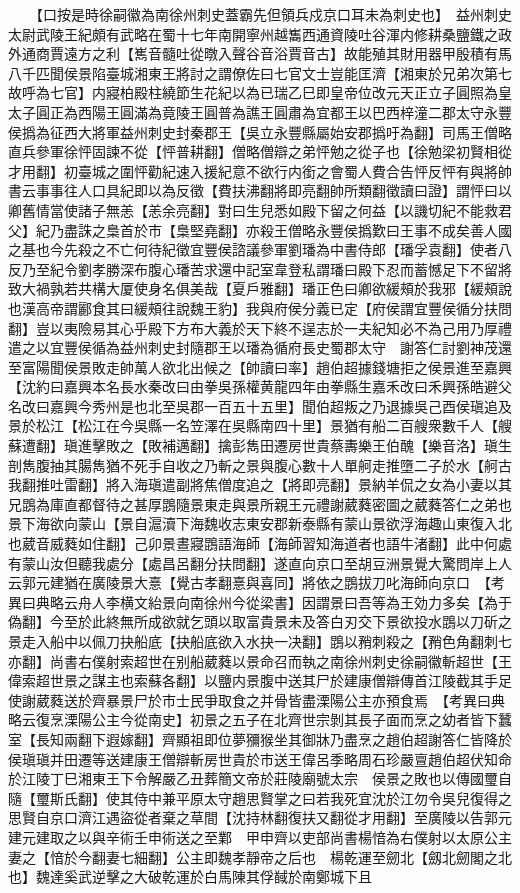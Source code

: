 　　【口按是時徐嗣徽為南徐州刺史蓋霸先但領兵戍京口耳未為刺史也】　益州刺史太尉武陵王紀頗有武略在蜀十七年南開寧州越雟西通資陵吐谷渾内修耕桑鹽鐵之政外通商賈遠方之利【嶲音髓吐從暾入聲谷音浴賈音古】故能殖其財用器甲殷積有馬八千匹聞侯景陷臺城湘東王將討之謂僚佐曰七官文士豈能匡濟【湘東於兄弟次第七故呼為七官】内寢柏殿柱繞節生花紀以為已瑞乙巳即皇帝位改元天正立子圓照為皇太子圓正為西陽王圓滿為竟陵王圓普為譙王圓肅為宜都王以巴西梓潼二郡太守永豐侯撝為征西大將軍益州刺史封秦郡王【吳立永豐縣屬始安郡撝吁為翻】司馬王僧略直兵參軍徐怦固諫不從【怦普耕翻】僧略僧辯之弟怦勉之從子也【徐勉梁初賢相從才用翻】初臺城之圍怦勸紀速入援紀意不欲行内銜之會蜀人費合告怦反怦有與將帥書云事事往人口具紀即以為反徵【費扶沸翻將即亮翻帥所類翻徵讀曰證】謂怦曰以卿舊情當使諸子無恙【恙余亮翻】對曰生兒悉如殿下留之何益【以譏切紀不能救君父】紀乃盡誅之梟首於市【梟堅堯翻】亦殺王僧略永豐侯撝歎曰王事不成矣善人國之基也今先殺之不亡何待紀徵宜豐侯諮議參軍劉璠為中書侍郎【璠孚袁翻】使者八反乃至紀令劉孝勝深布腹心璠苦求還中記室韋登私謂璠曰殿下忍而蓄憾足下不留將致大禍孰若共構大厦使身名俱美哉【夏戶雅翻】璠正色曰卿欲緩頰於我邪【緩頰說也漢高帝謂酈食其曰緩頰往說魏王豹】我與府侯分義已定【府侯謂宜豐侯循分扶問翻】豈以夷險易其心乎殿下方布大義於天下終不逞志於一夫紀知必不為己用乃厚禮遣之以宜豐侯循為益州刺史封隨郡王以璠為循府長史蜀郡太守　謝答仁討劉神茂還至富陽聞侯景敗走帥萬人欲北出候之【帥讀曰率】趙伯超據錢塘拒之侯景進至嘉興【沈約曰嘉興本名長水秦改曰由拳吳孫權黄龍四年由拳縣生嘉禾改曰禾興孫皓避父名改曰嘉興今秀州是也北至吳郡一百五十五里】聞伯超叛之乃退據吳己酉侯瑱追及景於松江【松江在今吳縣一名笠澤在吳縣南四十里】景猶有船二百艘衆數千人【艘蘇遭翻】瑱進擊敗之【敗補邁翻】擒彭雋田遷房世貴蔡夀樂王伯醜【樂音洛】瑱生剖雋腹抽其腸雋猶不死手自收之乃斬之景與腹心數十人單舸走推墮二子於水【舸古我翻推吐雷翻】將入海瑱遣副將焦僧度追之【將即亮翻】景納羊侃之女為小妻以其兄鵾為庫直都督待之甚厚鵾隨景東走與景所親王元禮謝葳蕤密圖之葳蕤答仁之弟也景下海欲向蒙山【景自滬瀆下海魏收志東安郡新泰縣有蒙山景欲浮海趣山東復入北也葳音威蕤如住翻】己卯景晝寢鵾語海師【海師習知海道者也語牛渚翻】此中何處有蒙山汝但聽我處分【處昌呂翻分扶問翻】遂直向京口至胡豆洲景覺大驚問岸上人云郭元建猶在廣陵景大憙【覺古孝翻憙與喜同】將依之鵾拔刀叱海師向京口　【考異曰典略云舟人李横文紿景向南徐州今從梁書】因謂景曰吾等為王効力多矣【為于偽翻】今至於此終無所成欲就乞頭以取富貴景未及答白刃交下景欲投水鵾以刀斫之景走入船中以佩刀抉船底【抉船底欲入水抉一决翻】鵾以矟刺殺之【矟色角翻刺七亦翻】尚書右僕射索超世在别船葳蕤以景命召而執之南徐州刺史徐嗣徽斬超世【王偉索超世景之謀主也索蘇各翻】以鹽内景腹中送其尸於建康僧辯傳首江陵截其手足使謝葳蕤送於齊暴景尸於市士民爭取食之并骨皆盡溧陽公主亦預食焉　【考異曰典略云復烹溧陽公主今從南史】初景之五子在北齊世宗剝其長子面而烹之幼者皆下蠶室【長知兩翻下遐嫁翻】齊顯祖即位夢獼猴坐其御牀乃盡烹之趙伯超謝答仁皆降於侯瑱瑱并田遷等送建康王僧辯斬房世貴於市送王偉呂季略周石珍嚴亶趙伯超伏知命於江陵丁巳湘東王下令解嚴乙丑葬簡文帝於莊陵廟號太宗　侯景之敗也以傳國璽自隨【璽斯氏翻】使其侍中兼平原太守趙思賢掌之曰若我死宜沈於江勿令吳兒復得之思賢自京口濟江遇盜從者棄之草間【沈持林翻復扶又翻從才用翻】至廣陵以告郭元建元建取之以與辛術壬申術送之至鄴　甲申齊以吏部尚書楊愔為右僕射以太原公主妻之【愔於今翻妻七細翻】公主即魏孝靜帝之后也　楊乾運至劒北【劔北劒閣之北也】魏達奚武逆擊之大破乾運於白馬陳其俘馘於南鄭城下且